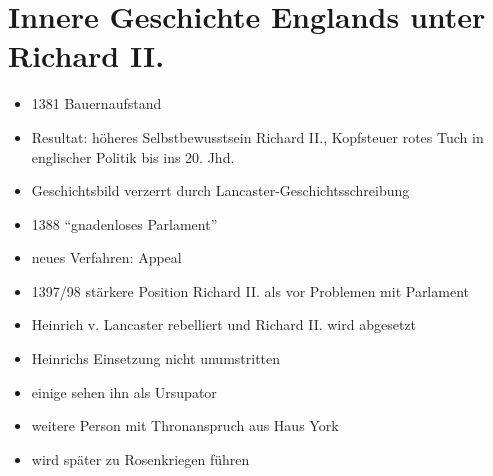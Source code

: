 \documentclass[10pt,a4paper,oneside,ngerman,numbers=noenddot]{scrartcl}
\newenvironment{myitemize}{\begin{itemize}\itemsep -2pt}{\end{itemize}} %
\begin{document}
\section*{Innere Geschichte Englands unter Richard II.}

\begin{myitemize}
	\item 1381 Bauernaufstand
	\item Resultat: höheres Selbstbewusstsein Richard II., Kopfsteuer rotes Tuch in englischer Politik bis ins 20. Jhd.
	\item Geschichtsbild verzerrt durch Lancaster-Geschichtsschreibung
	\item 1388 "`gnadenloses Parlament"'
	\item neues Verfahren: Appeal
	\item 1397/98 stärkere Position Richard II. als vor Problemen mit Parlament
	\item Heinrich v. Lancaster rebelliert und Richard II. wird abgesetzt
	\item Heinrichs Einsetzung nicht unumstritten
	\item einige sehen ihn als Ursupator
	\item weitere Person mit Thronanspruch aus Haus York
	\item wird später zu Rosenkriegen führen
\end{myitemize}
\end{document}
